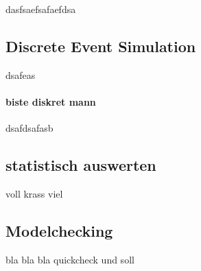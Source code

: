 dasfsaefsafaefdsa

\subsection{Discrete Event Simulation}

dsafeas

\paragraph{biste diskret mann}
dsafdsafasb

\subsection{statistisch auswerten}

voll krass viel

\subsection{Modelchecking}

bla bla bla quickcheck und soll

